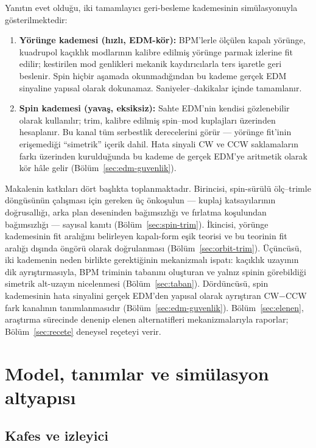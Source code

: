 \documentclass[preprint,12pt]{elsarticle}
\begin{document}
Yanıtın evet olduğu, iki tamamlayıcı geri-besleme kademesinin
simülasyonuyla gösterilmektedir:

\begin{enumerate}
\item \textbf{Yörünge kademesi (hızlı, EDM-kör):} BPM'lerle ölçülen
kapalı yörünge, kuadrupol kaçıklık modlarının kalibre edilmiş yörünge
parmak izlerine fit edilir; kestirilen mod genlikleri mekanik
kaydırıcılarla ters işaretle geri beslenir. Spin hiçbir aşamada
okunmadığından bu kademe gerçek EDM sinyaline yapısal olarak
dokunamaz. Saniyeler--dakikalar içinde tamamlanır.
\item \textbf{Spin kademesi (yavaş, eksiksiz):} Sahte EDM'nin kendisi
gözlenebilir olarak kullanılır; trim, kalibre edilmiş spin--mod
kuplajları üzerinden hesaplanır. Bu kanal tüm serbestlik derecelerini
görür --- yörünge fit'inin erişemediği ``simetrik'' içerik dahil.
Hata sinyali CW ve CCW saklamaların farkı üzerinden kurulduğunda bu
kademe de gerçek EDM'ye aritmetik olarak kör hâle gelir
(Bölüm~\ref{sec:edm-guvenlik}).
\end{enumerate}

Makalenin katkıları dört başlıkta toplanmaktadır. Birincisi,
spin-sürülü ölç--trimle döngüsünün çalışması için gereken üç önkoşulun
--- kuplaj katsayılarının doğrusallığı, arka plan deseninden
bağımsızlığı ve fırlatma koşulundan bağımsızlığı --- sayısal kanıtı
(Bölüm~\ref{sec:spin-trim}). İkincisi, yörünge kademesinin fit
aralığını belirleyen kapalı-form eşik teorisi ve bu teorinin fit
aralığı dışında öngörü olarak doğrulanması
(Bölüm~\ref{sec:orbit-trim}). Üçüncüsü, iki kademenin neden birlikte
gerektiğinin mekanizmalı ispatı: kaçıklık uzayının dik
ayrıştırmasıyla, BPM triminin tabanını oluşturan ve yalnız spinin
görebildiği simetrik alt-uzayın nicelenmesi (Bölüm~\ref{sec:taban}).
Dördüncüsü, spin kademesinin hata sinyalini gerçek EDM'den yapısal
olarak ayrıştıran CW$-$CCW fark kanalının tanımlanmasıdır
(Bölüm~\ref{sec:edm-guvenlik}). Bölüm~\ref{sec:elenen}, araştırma
sürecinde denenip elenen alternatifleri mekanizmalarıyla raporlar;
Bölüm~\ref{sec:recete} deneysel reçeteyi verir.

\section{Model, tanımlar ve simülasyon altyapısı}
\label{sec:model}

\subsection{Kafes ve izleyici}
\label{sec:kafes}
\end{document}
